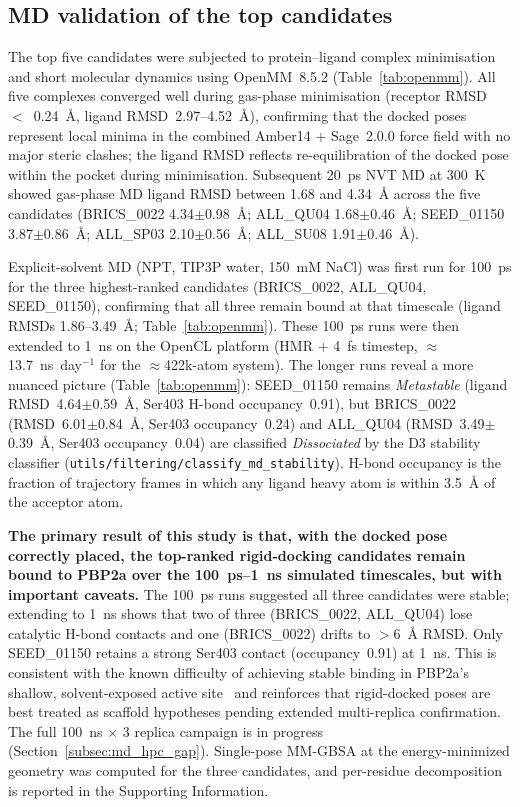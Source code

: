 \documentclass[12pt]{article}
\begin{document}
\subsection{MD validation of the top candidates}
\label{sec:md_validation}
The top five candidates were subjected to protein--ligand complex minimisation and short molecular dynamics using OpenMM~8.5.2 (Table~\ref{tab:openmm}). All five complexes converged well during gas-phase minimisation (receptor RMSD~$<$~0.24~\si{\angstrom}, ligand RMSD~2.97--4.52~\si{\angstrom}), confirming that the docked poses represent local minima in the combined Amber14 + Sage~2.0.0 force field with no major steric clashes; the ligand RMSD reflects re-equilibration of the docked pose within the pocket during minimisation. Subsequent 20~ps NVT MD at 300~K showed gas-phase MD ligand RMSD between 1.68 and 4.34~\si{\angstrom} across the five candidates (BRICS\_0022 4.34$\pm$0.98~\si{\angstrom}; ALL\_QU04 1.68$\pm$0.46~\si{\angstrom}; SEED\_01150 3.87$\pm$0.86~\si{\angstrom}; ALL\_SP03 2.10$\pm$0.56~\si{\angstrom}; ALL\_SU08 1.91$\pm$0.46~\si{\angstrom}).

Explicit-solvent MD (NPT, TIP3P water, 150~mM NaCl) was first run for 100~ps for the three highest-ranked candidates (BRICS\_0022, ALL\_QU04, SEED\_01150), confirming that all three remain bound at that timescale (ligand RMSDs 1.86--3.49~\si{\angstrom}; Table~\ref{tab:openmm}). These 100~ps runs were then extended to 1~ns on the OpenCL platform (HMR + 4~fs timestep, $\approx$13.7~ns~day$^{-1}$ for the $\approx$422k-atom system). The longer runs reveal a more nuanced picture (Table~\ref{tab:openmm}): SEED\_01150 remains \emph{Metastable} (ligand RMSD~4.64$\pm$0.59~\si{\angstrom}, Ser403 H-bond occupancy~0.91), but BRICS\_0022 (RMSD~6.01$\pm$0.84~\si{\angstrom}, Ser403 occupancy~0.24) and ALL\_QU04 (RMSD~3.49$\pm$0.39~\si{\angstrom}, Ser403 occupancy~0.04) are classified \emph{Dissociated} by the D3 stability classifier (\texttt{utils/filtering/classify\_md\_stability}). H-bond occupancy is the fraction of trajectory frames in which any ligand heavy atom is within \SI{3.5}{\angstrom} of the acceptor atom.

\textbf{The primary result of this study is that, with the docked pose correctly placed, the top-ranked rigid-docking candidates remain bound to PBP2a over the 100~ps--1~ns simulated timescales, but with important caveats.} The 100~ps runs suggested all three candidates were stable; extending to 1~ns shows that two of three (BRICS\_0022, ALL\_QU04) lose catalytic H-bond contacts and one (BRICS\_0022) drifts to $>$6~\si{\angstrom} RMSD. Only SEED\_01150 retains a strong Ser403 contact (occupancy~0.91) at 1~ns. This is consistent with the known difficulty of achieving stable binding in PBP2a's shallow, solvent-exposed active site~\cite{troczi2013} and reinforces that rigid-docked poses are best treated as scaffold hypotheses pending extended multi-replica confirmation. The full 100~ns $\times$ 3 replica campaign is in progress (Section~\ref{subsec:md_hpc_gap}). Single-pose MM-GBSA at the energy-minimized geometry was computed for the three candidates, and per-residue decomposition is reported in the Supporting Information.
\end{document}
